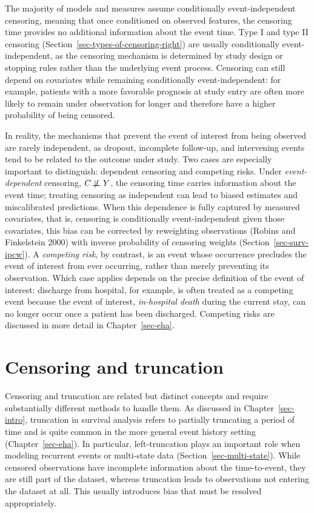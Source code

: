 \documentclass[
  letterpaper,
  krantz2]{style/krantz}
\begin{document}
The majority of models and measures assume conditionally
event-independent censoring, meaning that once conditioned on observed
features, the censoring time provides no additional information about
the event time. Type I and type
II censoring
(Section~\ref{sec-types-of-censoring-right}) are usually conditionally
event-independent, as the censoring mechanism is determined by study
design or stopping rules rather than the underlying event process.
Censoring can still depend on covariates while remaining conditionally
event-independent: for example, patients with a more favorable prognosis
at study entry are often more likely to remain under observation for
longer and therefore have a higher probability of being censored.

In reality, the mechanisms that prevent the event of interest from being
observed are rarely independent, as dropout, incomplete follow-up, and
intervening events tend to be related to the outcome under study. Two
cases are especially important to distinguish: dependent censoring and
competing risks. Under \emph{event-dependent}
censoring, \(C \not\!\perp\!\!\!\perp Y\),
the censoring time carries information about the event time; treating
censoring as independent can lead to biased estimates and miscalibrated
predictions. When this dependence is fully captured by measured
covariates, that is, censoring is conditionally event-independent given
those covariates, this bias can be corrected by reweighting observations
(Robins and Finkelstein 2000) with inverse probability of censoring
weights (Section~\ref{sec-surv-ipcw}). A \emph{competing
risk}, by contrast, is an event whose occurrence
precludes the event of interest from ever occurring, rather than merely
preventing its observation. Which case applies depends on the precise
definition of the event of interest: discharge from hospital, for
example, is often treated as a competing event because the event of
interest, \emph{in-hospital death} during the current stay, can no
longer occur once a patient has been discharged. Competing risks are
discussed in more detail in Chapter~\ref{sec-eha}.

\section{Censoring and truncation}\label{sec-truncation}

Censoring and truncation are related but distinct
concepts and require substantially different methods to handle them. As
discussed in Chapter~\ref{sec-intro}, truncation in survival analysis
refers to partially truncating a period of time and is quite common in
the more general event history setting (Chapter~\ref{sec-eha}). In
particular, left-truncation plays an important role when modeling
recurrent events or multi-state
data (Section~\ref{sec-multi-state}). While
censored observations have incomplete information about the
time-to-event, they are still part of the dataset, whereas truncation
leads to observations not entering the dataset at all. This usually
introduces bias that must be resolved appropriately.
\end{document}
